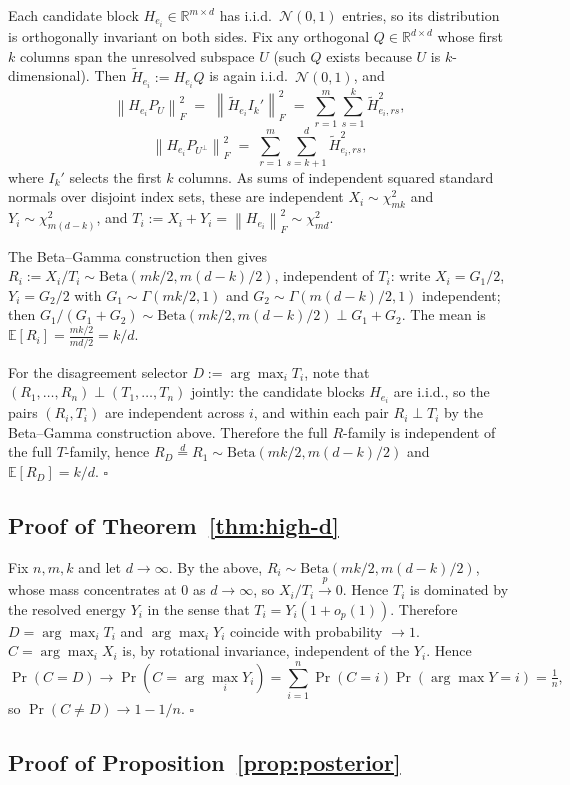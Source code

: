 \documentclass{article}
\newcommand{\real}{\mathbb{R}}
\newcommand{\norm}[1]{\left\lVert #1 \right\rVert}
\theoremstyle{plain}
\theoremstyle{definition}
\theoremstyle{remark}
\begin{document}
Each candidate block $H_{e_i}\in\real^{m\times d}$ has i.i.d.~$\mathcal{N}(0,1)$
entries, so its distribution is orthogonally invariant on both sides. Fix
any orthogonal $Q\in\real^{d\times d}$ whose first $k$ columns span the
unresolved subspace $U$ (such $Q$ exists because $U$ is $k$-dimensional).
Then $\tilde H_{e_i}:=H_{e_i}Q$ is again i.i.d.~$\mathcal{N}(0,1)$, and
\[
\norm{H_{e_i}P_U}_F^2 \;=\; \norm{\tilde H_{e_i} I_{k}'}_F^2 \;=\; \sum_{r=1}^{m}\sum_{s=1}^{k}\tilde H_{e_i,rs}^2,
\]
\[
\norm{H_{e_i}P_{U^\perp}}_F^2 \;=\; \sum_{r=1}^{m}\sum_{s=k+1}^{d}\tilde H_{e_i,rs}^2,
\]
where $I_k'$ selects the first $k$ columns. As sums of independent squared
standard normals over disjoint index sets, these are independent
$X_i\sim\chi^2_{mk}$ and $Y_i\sim\chi^2_{m(d-k)}$, and
$T_i:=X_i+Y_i=\norm{H_{e_i}}_F^2\sim\chi^2_{md}$.

The Beta--Gamma construction then gives $R_i:=X_i/T_i\sim\mathrm{Beta}(mk/2,m(d-k)/2)$,
independent of $T_i$: write $X_i=G_1/2$, $Y_i=G_2/2$ with $G_1\sim\Gamma(mk/2,1)$
and $G_2\sim\Gamma(m(d-k)/2,1)$ independent; then
$G_1/(G_1+G_2)\sim\mathrm{Beta}(mk/2,m(d-k)/2)\perp G_1+G_2$. The mean is
$\mathbb{E}[R_i]=\frac{mk/2}{md/2}=k/d$.

For the disagreement selector $D:=\arg\max_i T_i$, note that $(R_1,\ldots,R_n)\perp(T_1,\ldots,T_n)$
jointly: the candidate blocks $H_{e_i}$ are i.i.d., so the pairs
$(R_i,T_i)$ are independent across $i$, and within each pair
$R_i\perp T_i$ by the Beta--Gamma construction above. Therefore the full
$R$-family is independent of the full $T$-family, hence
$R_D\stackrel{d}{=}R_1\sim\mathrm{Beta}(mk/2,m(d-k)/2)$ and
$\mathbb{E}[R_D]=k/d$. \hfill$\square$

\subsection{Proof of Theorem~\ref{thm:high-d}}

Fix $n,m,k$ and let $d\to\infty$. By the above, $R_i\sim\mathrm{Beta}(mk/2,m(d-k)/2)$,
whose mass concentrates at $0$ as $d\to\infty$, so
$X_i/T_i\stackrel{p}{\to}0$. Hence $T_i$ is dominated by the resolved
energy $Y_i$ in the sense that
$T_i=Y_i(1+o_p(1))$. Therefore $D=\arg\max_i T_i$ and $\arg\max_i Y_i$
coincide with probability $\to 1$. $C=\arg\max_i X_i$ is, by rotational
invariance, independent of the $Y_i$. Hence
\[
\Pr(C=D)\to\Pr(C=\arg\max_i Y_i)=\sum_{i=1}^n\Pr(C=i)\Pr(\arg\max Y=i)=\tfrac{1}{n},
\]
so $\Pr(C\ne D)\to 1-1/n$. \hfill$\square$

\subsection{Proof of Proposition~\ref{prop:posterior}}
\end{document}
